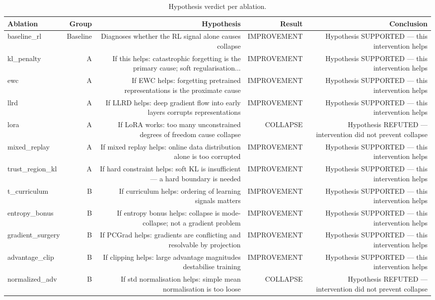 \begin{table}[htbp]
\centering
\caption{Hypothesis verdict per ablation.}
\label{tab:hypothesis}
\begin{tabular}{lrrrr}
\toprule
\textbf{Ablation} & \textbf{Group} & \textbf{Hypothesis} & \textbf{Result} & \textbf{Conclusion} \\
\midrule
baseline\_rl & Baseline & Diagnoses whether the RL signal alone causes collapse & IMPROVEMENT & Hypothesis SUPPORTED — this intervention helps \\
kl\_penalty & A & If this helps: catastrophic forgetting is the primary cause; soft regularisation... & IMPROVEMENT & Hypothesis SUPPORTED — this intervention helps \\
ewc & A & If EWC helps: forgetting pretrained representations is the proximate cause & IMPROVEMENT & Hypothesis SUPPORTED — this intervention helps \\
llrd & A & If LLRD helps: deep gradient flow into early layers corrupts representations & IMPROVEMENT & Hypothesis SUPPORTED — this intervention helps \\
lora & A & If LoRA works: too many unconstrained degrees of freedom cause collapse & COLLAPSE & Hypothesis REFUTED — intervention did not prevent collapse \\
mixed\_replay & A & If mixed replay helps: online data distribution alone is too corrupted & IMPROVEMENT & Hypothesis SUPPORTED — this intervention helps \\
trust\_region\_kl & A & If hard constraint helps: soft KL is insufficient — a hard boundary is needed & IMPROVEMENT & Hypothesis SUPPORTED — this intervention helps \\
t\_curriculum & B & If curriculum helps: ordering of learning signals matters & IMPROVEMENT & Hypothesis SUPPORTED — this intervention helps \\
entropy\_bonus & B & If entropy bonus helps: collapse is mode-collapse; not a gradient problem & IMPROVEMENT & Hypothesis SUPPORTED — this intervention helps \\
gradient\_surgery & B & If PCGrad helps: gradients are conflicting and resolvable by projection & IMPROVEMENT & Hypothesis SUPPORTED — this intervention helps \\
advantage\_clip & B & If clipping helps: large advantage magnitudes destabilise training & IMPROVEMENT & Hypothesis SUPPORTED — this intervention helps \\
normalized\_adv & B & If std normalisation helps: simple mean normalisation is too loose & COLLAPSE & Hypothesis REFUTED — intervention did not prevent collapse \\

\end{tabular}
\end{table}
